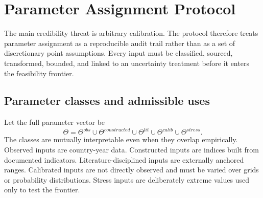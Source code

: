 \documentclass[11pt,a4paper]{article}
\begin{document}
\section{Parameter Assignment Protocol}\label{sec:parameters}

The main credibility threat is arbitrary calibration. The protocol therefore treats parameter assignment as a reproducible audit trail rather than as a set of discretionary point assumptions. Every input must be classified, sourced, transformed, bounded, and linked to an uncertainty treatment before it enters the feasibility frontier.

\subsection{Parameter classes and admissible uses}

Let the full parameter vector be
\begin{equation}
    \Theta=
    \Theta^{obs}\cup\Theta^{constructed}\cup\Theta^{lit}\cup\Theta^{calib}\cup\Theta^{stress}.
\end{equation}
The classes are mutually interpretable even when they overlap empirically. Observed inputs are country-year data. Constructed inputs are indices built from documented indicators. Literature-disciplined inputs are externally anchored ranges. Calibrated inputs are not directly observed and must be varied over grids or probability distributions. Stress inputs are deliberately extreme values used only to test the frontier.
\end{document}
